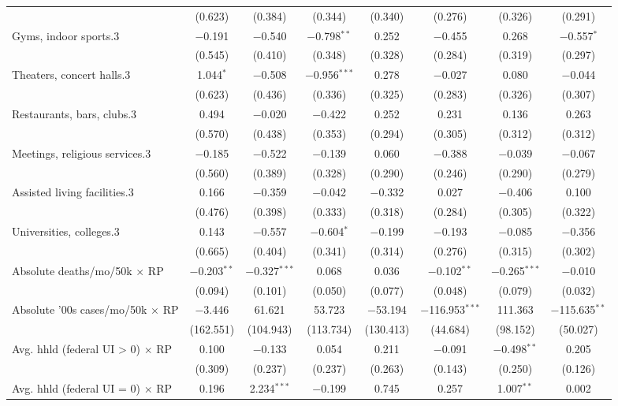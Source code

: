 \begin{table}[!htbp]
\begin{tabular}{@{\extracolsep{5pt}}lccccccc}
  & (0.623) & (0.384) & (0.344) & (0.340) & (0.276) & (0.326) & (0.291) \\ 
  Gyms, indoor sports.3 & $-$0.191 & $-$0.540 & $-$0.798$^{**}$ & 0.252 & $-$0.455 & 0.268 & $-$0.557$^{*}$ \\ 
  & (0.545) & (0.410) & (0.348) & (0.328) & (0.284) & (0.319) & (0.297) \\ 
  Theaters, concert halls.3 & 1.044$^{*}$ & $-$0.508 & $-$0.956$^{***}$ & 0.278 & $-$0.027 & 0.080 & $-$0.044 \\ 
  & (0.623) & (0.436) & (0.336) & (0.325) & (0.283) & (0.326) & (0.307) \\ 
  Restaurants, bars, clubs.3 & 0.494 & $-$0.020 & $-$0.422 & 0.252 & 0.231 & 0.136 & 0.263 \\ 
  & (0.570) & (0.438) & (0.353) & (0.294) & (0.305) & (0.312) & (0.312) \\ 
  Meetings, religious services.3 & $-$0.185 & $-$0.522 & $-$0.139 & 0.060 & $-$0.388 & $-$0.039 & $-$0.067 \\ 
  & (0.560) & (0.389) & (0.328) & (0.290) & (0.246) & (0.290) & (0.279) \\ 
  Assisted living facilities.3 & 0.166 & $-$0.359 & $-$0.042 & $-$0.332 & 0.027 & $-$0.406 & 0.100 \\ 
  & (0.476) & (0.398) & (0.333) & (0.318) & (0.284) & (0.305) & (0.322) \\ 
  Universities, colleges.3 & 0.143 & $-$0.557 & $-$0.604$^{*}$ & $-$0.199 & $-$0.193 & $-$0.085 & $-$0.356 \\ 
  & (0.665) & (0.404) & (0.341) & (0.314) & (0.276) & (0.315) & (0.302) \\ 
  Absolute deaths/mo/50k $\times$ RP & $-$0.203$^{**}$ & $-$0.327$^{***}$ & 0.068 & 0.036 & $-$0.102$^{**}$ & $-$0.265$^{***}$ & $-$0.010 \\ 
  & (0.094) & (0.101) & (0.050) & (0.077) & (0.048) & (0.079) & (0.032) \\ 
  Absolute '00s cases/mo/50k $\times$ RP & $-$3.446 & 61.621 & 53.723 & $-$53.194 & $-$116.953$^{***}$ & 111.363 & $-$115.635$^{**}$ \\ 
  & (162.551) & (104.943) & (113.734) & (130.413) & (44.684) & (98.152) & (50.027) \\ 
  Avg. hhld  (federal UI > 0) $\times$ RP & 0.100 & $-$0.133 & 0.054 & 0.211 & $-$0.091 & $-$0.498$^{**}$ & 0.205 \\ 
  & (0.309) & (0.237) & (0.237) & (0.263) & (0.143) & (0.250) & (0.126) \\ 
  Avg. hhld  (federal UI = 0) $\times$ RP & 0.196 & 2.234$^{***}$ & $-$0.199 & 0.745 & 0.257 & 1.007$^{**}$ & 0.002 \\ 

\end{tabular}
\end{table}
